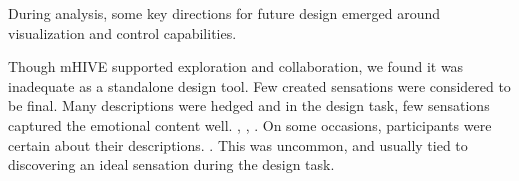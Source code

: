 


During analysis, some key directions for future design emerged around visualization and control capabilities.

Though mHIVE supported exploration and collaboration, we found %
it was inadequate as a standalone design tool.
Few created sensations were considered to be final.
Many descriptions were hedged %
and in the design task, few sensations captured the emotional content well.%
	,
	,
	.
On some occasions, participants were certain about their descriptions.
.
This was uncommon, and usually tied to discovering an ideal sensation during the design task.



